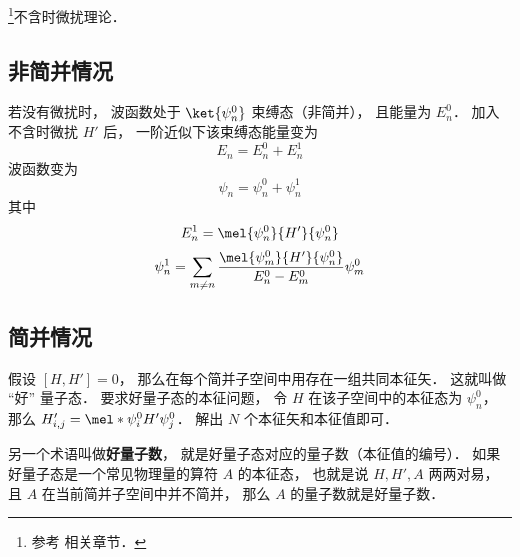 
\begin{issues}
\issueDraft
\end{issues}

\footnote{参考 \cite{GriffQ} 相关章节．}不含时微扰理论．

\subsection{非简并情况}
若没有微扰时， 波函数处于 $\ket{\psi_n^0}$ 束缚态（非简并）， 且能量为 $E_n^0$． 加入不含时微扰 $H'$ 后， 一阶近似下该束缚态能量变为
\begin{equation}
E_n = E_n^0 + E_n^1
\end{equation}
波函数变为
\begin{equation}
\psi_n = \psi_n^0 + \psi_n^1
\end{equation}
其中
\begin{equation}
E_n^1 = \mel{\psi_n^0}{H'}{\psi_n^0}
\end{equation}
\begin{equation}
\psi_n^1 = \sum_{m \ne n} \frac{\mel{\psi_m^0}{H'}{\psi_n^0}}{E_n^0 - E_m^0} \psi_m^0
\end{equation}

\subsection{简并情况}
假设 $[H, H'] = 0$， 那么在每个简并子空间中用存在一组共同本征矢． 这就叫做 “好” 量子态． 要求好量子态的本征问题， 令 $H$ 在该子空间中的本征态为 $\psi_n^0$， 那么 $H'_{i,j} = \mel*{\psi_i^0}{H'}{\psi_j^0}$． 解出 $N$ 个本征矢和本征值即可．

另一个术语叫做\textbf{好量子数}， 就是好量子态对应的量子数（本征值的编号）． 如果好量子态是一个常见物理量的算符 $A$ 的本征态， 也就是说 $H, H', A$ 两两对易， 且 $A$ 在当前简并子空间中并不简并， 那么 $A$ 的量子数就是好量子数．

